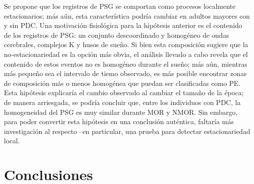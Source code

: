 \documentclass[12pt,a4paper]{mitthesis}
\begin{document}
Se propone que los registros de PSG se comportan como procesos localmente estacionarios; m\'as 
a\'un, esta caracter\'istica podr\'ia cambiar en adultos mayores con y sin PDC. 
Una motivaci\'on fisiol\'ogica para la hip\'otesis anterior es el contenido de los registros de
PSG: un conjunto descoordinado y homog\'eneo de ondas cerebrales, complejos K y husos de sue\~no.
Si bien esta composici\'on sugiere que la no-estacionariedad es la opci\'on m\'as obvia, el
an\'alisis llevado a cabo revela que el contenido de estos eventos no es homog\'eneo durante el
sue\~no; m\'as a\'un, mientras m\'as peque\~no sea el intervalo de tiemo observado, es m\'as
posible encontrar zonas de composici\'on m\'as o menos homog\'enea que puedan ser clasificadas
como PE.
Esta hip\'otesis explicar\'ia el cambio observado al cambiar el tama\~no de la \'epoca; de manera
arriesgada, se podr\'ia concluir que, entre los individuos con PDC, la homogeneidad del PSG es muy
similar durante MOR y NMOR.
Sin embargo, para poder convertir esta hip\'otesis en una conclusi\'on aut\'entica, faltar\'ia
m\'as investigaci\'on al respecto --en particular, una prueba para detectar estacionariedad local.




\section{Conclusiones}
\end{document}

